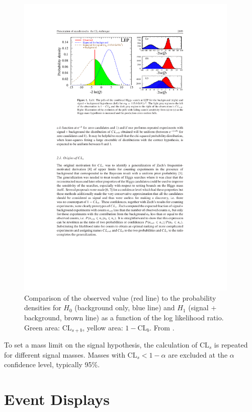 \documentclass[12pt]{thesis}  %
\begin{document}
\begin{figure}[hbt]
\begin{center}
\includegraphics[width=0.95\textwidth]{figures/g21013-fig1.pdf}
\caption{Comparison of the observed value (red line) to the probability densities for $H_{0}$ (background only, blue line) and $H_{1}$ (signal + background, brown line) as a function of the log likelihood ratio. Green area: $\text{CL}_{s+b}$, yellow area: $1-\text{CL}_{b}$. From \cite{Read:presentation}.}
\label{fig:q}
\end{center}
\end{figure}

To set a mass limit on the signal hypothesis, the calculation of $\text{CL}_{s}$ is repeated for different signal masses. Masses with $\text{CL}_{s} < 1 - \alpha$ are excluded at the $\alpha$ confidence level, typically 95\%.
\chapter{Event Displays
\label{ch:displays}}
\end{document}
